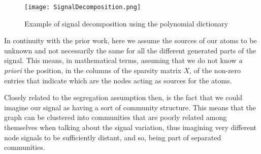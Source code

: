 \begin{figure}
\centering
\texttt{[image: SignalDecomposition.png]}
\caption{Example of signal decomposition using the polynomial dictionary}
\label{fig:components}
\end{figure}

In continuity with the prior work, here we assume the sources of our atoms to be unknown and not necessarily the same for all the different generated parts of the signal. This means, in mathematical terms, assuming that we do not know \textit{a priori} the position, in the columns of the sparsity matrix $X$, of the non-zero entries that indicate which are the nodes acting as sources for the atoms.

Closely related to the segregation assumption then, is the fact that we could imagine our signal as having a sort of community structure. This means that the graph can be clustered into communities that are poorly related among themselves when talking about the signal variation, thus imagining very different node signals to be sufficiently distant, and so, being part of separated communities.


